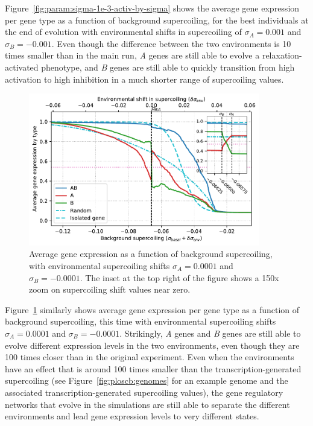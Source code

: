 Figure~\ref{fig:param:sigma-1e-3-activ-by-sigma} shows the average gene expression per gene type as a function of background supercoiling, for the best individuals at the end of evolution with environmental shifts in supercoiling of $\sigma_A = 0.001$ and $\sigma_B = -0.001$.
Even though the difference between the two environments is 10 times smaller than in the main run, \emph{A} genes are still able to evolve a relaxation-activated phenotype, and \emph{B} genes are still able to quickly transition from high activation to high inhibition in a much shorter range of supercoiling values.

\begin{figure}
\centering
\includegraphics[width=0.9\textwidth]{param/sigma/sigma-1e-4/activity_sigmas_avg.pdf}
\caption[Average gene expression as a function of background supercoiling, with an absolute environmental supercoiling shift of 0.0001]{Average gene expression as a function of background supercoiling, with environmental supercoiling shifts $\sigma_A = 0.0001$ and $\sigma_B = -0.0001$.
The inset at the top right of the figure shows a 150x zoom on supercoiling shift values near zero.}
\label{fig:param:sigma-1e-4-activ-by-sigma}
\end{figure}

Figure~\ref{fig:param:sigma-1e-4-activ-by-sigma} similarly shows average gene expression per gene type as a function of background supercoiling, this time with environmental supercoiling shifts $\sigma_A = 0.0001$ and $\sigma_B = -0.0001$.
Strikingly, \emph{A} genes and \emph{B} genes are still able to evolve different expression levels in the two environments, even though they are 100 times closer than in the original experiment.
Even when the environments have an effect that is around 100 times smaller than the transcription-generated supercoiling (see Figure~\ref{fig:ploscb:genomes} for an example genome and the associated transcription-generated supercoiling values), the gene regulatory networks that evolve in the simulations are still able to separate the different environments and lead gene expression levels to very different states.

